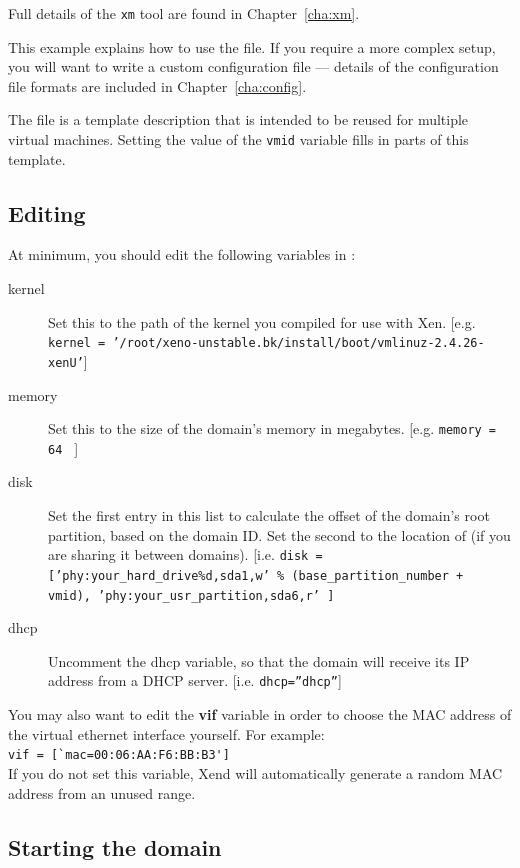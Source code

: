 \documentclass[11pt,twoside,final,openright]{xenstyle}
\begin{document}
Full details of the {\tt xm} tool are found in Chapter~\ref{cha:xm}.

This example explains how to use the  file.  If you
require a more complex setup, you will want to write a custom
configuration file --- details of the configuration file formats are
included in Chapter~\ref{cha:config}.

The  file is a template description that is intended
to be reused for multiple virtual machines.  Setting the value of the
{\tt vmid} variable fills in parts of this template.

\subsection{Editing }

At minimum, you should edit the following variables in :

\begin{description}
\item[kernel] Set this to the path of the kernel you compiled for use
              with Xen. [e.g. {\tt kernel =
              '/root/xeno-unstable.bk/install/boot/vmlinuz-2.4.26-xenU'}]
\item[memory] Set this to the size of the domain's memory in
megabytes. [e.g. {\tt memory = 64 } ]
\item[disk] Set the first entry in this list to calculate the offset
of the domain's root partition, based on the domain ID.  Set the
second to the location of  (if you are sharing it between
domains). [i.e. {\tt disk = ['phy:your\_hard\_drive\%d,sda1,w' \%
(base\_partition\_number + vmid), 'phy:your\_usr\_partition,sda6,r' ]}
\item[dhcp] Uncomment the dhcp variable, so that the domain will
receive its IP address from a DHCP server. [i.e. {\tt dhcp=''dhcp''}]
\end{description}

You may also want to edit the {\bf vif} variable in order to choose
the MAC address of the virtual ethernet interface yourself.  For
example: \\ \verb_vif = [`mac=00:06:AA:F6:BB:B3']_\\ If you do not set
this variable, Xend will automatically generate a random MAC address
from an unused range.

\subsection{Starting the domain}
\end{document}
